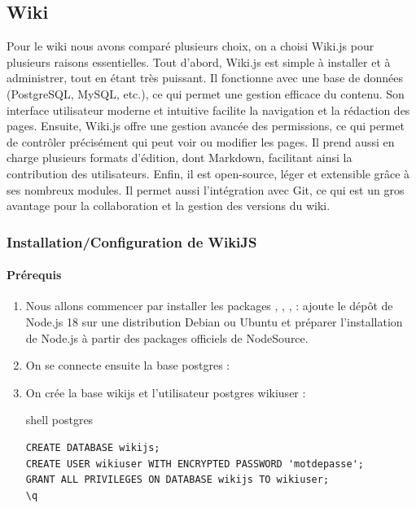 \documentclass{article}
\begin{document}
\subsection{Wiki}

Pour le wiki nous avons comparé plusieurs choix, on a choisi Wiki.js pour plusieurs raisons essentielles.
Tout d’abord, Wiki.js est simple à installer et à administrer, tout en étant très puissant. Il fonctionne avec une base de données (PostgreSQL, MySQL, etc.), ce qui permet une gestion efficace du contenu. Son interface utilisateur moderne et intuitive facilite la navigation et la rédaction des pages.
Ensuite, Wiki.js offre une gestion avancée des permissions, ce qui permet de contrôler précisément qui peut voir ou modifier les pages. Il prend aussi en charge plusieurs formats d’édition, dont Markdown, facilitant ainsi la contribution des utilisateurs.
Enfin, il est open-source, léger et extensible grâce à ses nombreux modules. Il permet aussi l’intégration avec Git, ce qui est un gros avantage pour la collaboration et la gestion des versions du wiki.

\subsubsection{Installation/Configuration de WikiJS}

\paragraph{Prérequis\\}

\begin{enumerate}
	\item Nous allons commencer par installer les packages , ,  ,  :
ajoute le dépôt de Node.js 18 sur une distribution Debian ou Ubuntu et préparer l’installation de Node.js à partir des packages officiels de NodeSource.
	\item On se connecte ensuite la base postgres : 
	\item On crée la base wikijs et l'utilisateur postgres wikiuser :
	\begin{codebox}{shell postgres}
\begin{lstlisting}
CREATE DATABASE wikijs;
CREATE USER wikiuser WITH ENCRYPTED PASSWORD 'motdepasse';
GRANT ALL PRIVILEGES ON DATABASE wikijs TO wikiuser;
\q
\end{lstlisting}
\end{codebox}
\end{enumerate}
\end{document}
